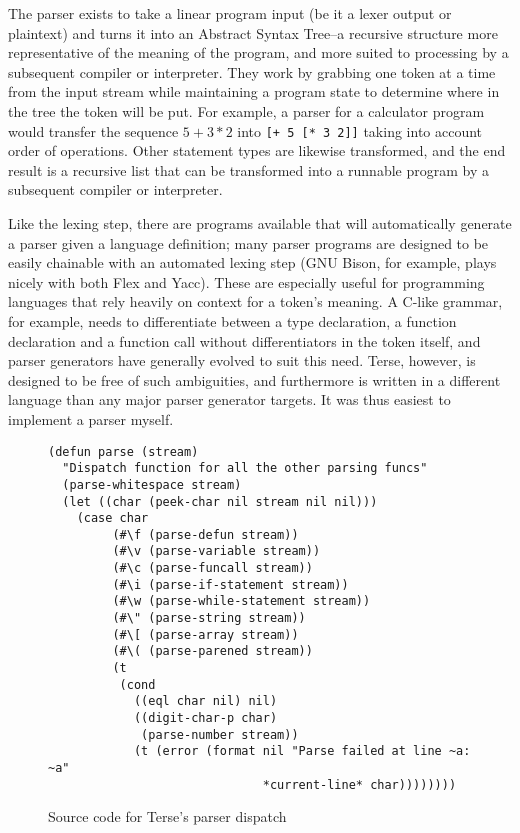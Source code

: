 \documentclass[12pt]{article}
\newcommand{\code}[1]{\texttt{#1}}
\begin{document}
The parser exists to take a linear program input (be it a lexer output
or plaintext) and turns it into an Abstract Syntax Tree--a recursive
structure more representative of the meaning of the program, and more
suited to processing by a subsequent compiler or interpreter. They
work by grabbing one token at a time from the input stream while
maintaining a program state to determine where in the tree the token
will be put. For example, a parser for a calculator program would
transfer the sequence $5 + 3 * 2$ into \code{[+ 5 [* 3 2]]} taking
into account order of operations. Other statement types are likewise
transformed, and the end result is a recursive list that can be
transformed into a runnable program by a subsequent compiler or
interpreter.

Like the lexing step, there are programs available that will
automatically generate a parser given a language definition; many
parser programs are designed to be easily chainable with an automated
lexing step (GNU Bison, for example, plays nicely with both Flex and
Yacc). These are especially useful for programming languages that rely
heavily on context for a token's meaning. A C-like grammar, for
example, needs to differentiate between a type declaration, a function
declaration and a function call without differentiators in the token
itself, and parser generators have generally evolved to suit this
need. Terse, however, is designed to be free of such ambiguities, and
furthermore is written in a different language than any major parser
generator targets. It was thus easiest to implement a parser myself.

\begin{figure}
\begin{verbatim}
(defun parse (stream)
  "Dispatch function for all the other parsing funcs"
  (parse-whitespace stream)
  (let ((char (peek-char nil stream nil nil)))
    (case char
         (#\f (parse-defun stream))
         (#\v (parse-variable stream))
         (#\c (parse-funcall stream))
         (#\i (parse-if-statement stream))
         (#\w (parse-while-statement stream))
         (#\" (parse-string stream))
         (#\[ (parse-array stream))
         (#\( (parse-parened stream))
         (t
          (cond
            ((eql char nil) nil)
            ((digit-char-p char)
             (parse-number stream))
            (t (error (format nil "Parse failed at line ~a: ~a"
                              *current-line* char))))))))
\end{verbatim}
\caption{Source code for Terse's parser dispatch}
\end{figure}
\end{document}
